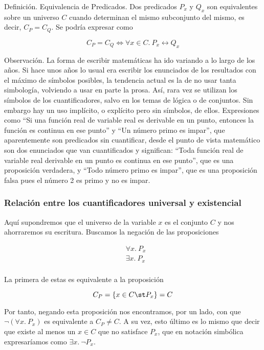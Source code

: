 Definición. Equivalencia de Predicados. Dos predicados $P_x$ y $Q_x$ son
equivalentes sobre un universo $C$ cuando determinan el mismo subconjunto
del mismo, es decir, $C_P = C_Q$. Se podría expresar como

$$ C_P = C_Q \iff \forall x \in C.\ P_x \leftrightarrow Q_x $$

Observación. La forma de escribir matemáticas ha ido variando a lo largo de
los años. Si hace unos años lo usual era escribir los enunciados de los
resultados con el máximo de símbolos posibles, la tendencia actual es la de
no usar tanta simbología, volviendo a usar en parte la prosa. Así, rara vez
se utilizan los símbolos de los cuantificadores, salvo en los temas de
lógica o de conjuntos. Sin embargo hay un uso implícito, o explícito pero
sin símbolos, de ellos. Expresiones como ``Si una función real de variable
real es derivable en un punto, entonces la función es continua en ese
punto'' y ``Un número primo es impar'', que aparentemente son predicados sin
cuantificar, desde el punto de vista matemático son dos enunciados que van
cuantificados y significan: ``Toda función real de variable real derivable
en un punto es continua en ese punto'', que es una proposición verdadera, y
``Todo número primo es impar'', que es una proposición falsa pues el número
2 es primo y no es impar.




\subsubsection{Relación entre los cuantificadores universal y existencial}

Aquí supondremos que el universo de la variable $x$ es el conjunto $C$ y nos
ahorraremos su escritura. Buscamos la negación de las proposiciones

\begin{align*}
  & \forall x. \ P_x \\
  & \exists x. \ P_x \\
\end{align*}

\noindent La primera de estas es equivalente a la proposición

$$ C_P = \{x \in C \st P_x\} = C $$

Por tanto, negando esta proposición nos encontramos, por un lado, con que
$\neg(\forall x. \ P_x)$ es equivalente a $C_P \neq C$. A su vez, esto
último es lo mismo que decir que existe al menos un $x \in C$ que no
satisface $P_x$, que en notación simbólica expresaríamos como $\exists x.\
\neg P_x$.

